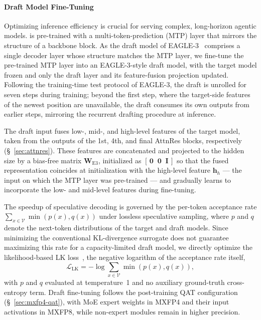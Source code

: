 \paragraph{Draft Model Fine-Tuning}
\label{sec:post-eagle3}
Optimizing inference efficiency is crucial for serving complex, long-horizon agentic models.
 is pre-trained with a multi-token-prediction (MTP) layer that mirrors the structure of a backbone block.
As the draft model of EAGLE-3~\citep{li2025eagle3} comprises a single decoder layer whose structure matches the MTP layer, we fine-tune the pre-trained MTP layer into an EAGLE-3-style draft model, with the target model frozen and only the draft layer and its feature-fusion projection updated.
Following the training-time test protocol of EAGLE-3, the draft is unrolled for seven steps during training; beyond the first step, where the target-side features of the newest position are unavailable, the draft consumes its own outputs from earlier steps, mirroring the recurrent drafting procedure at inference.

The draft input fuses low-, mid-, and high-level features of the target model, taken from the outputs of the 1st, 4th, and final AttnRes blocks, respectively (\S~\ref{sec:attnres}).
These features are concatenated and projected to the hidden size by a bias-free matrix $\bm{W}_{\mathrm{E3}}$, initialized as $[\,\bm{0}\;\;\bm{0}\;\;\bm{I}\,]$ so that the fused representation coincides at initialization with the high-level feature $\bm{h}_{h}$ --- the input on which the MTP layer was pre-trained --- and gradually learns to incorporate the low- and mid-level features during fine-tuning.

The speedup of speculative decoding is governed by the per-token acceptance rate $\sum_{x \in \mathcal{V}} \min\!\left(p(x), q(x)\right)$ under lossless speculative sampling, where $p$ and $q$ denote the next-token distributions of the target and draft models.
Since minimizing the conventional KL-divergence surrogate does not guarantee maximizing this rate for a capacity-limited draft model, we directly optimize the likelihood-based LK loss~\citep{samarin2026lklosses}, the negative logarithm of the acceptance rate itself,
\begin{equation}
    \mathcal{L}_{\mathrm{LK}}
    = -\log \sum_{x \in \mathcal{V}}
    \min\!\left(p(x), q(x)\right),
\end{equation}
with $p$ and $q$ evaluated at temperature~1 and no auxiliary ground-truth cross-entropy term.
Draft fine-tuning follows the post-training QAT configuration (\S~\ref{sec:mxfp4-qat}), with MoE expert weights in MXFP4 and their input activations in MXFP8, while non-expert modules remain in higher precision.



